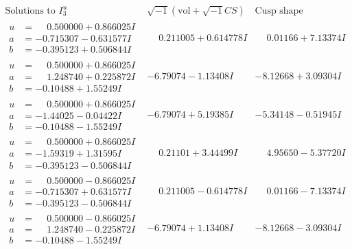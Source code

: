 \documentclass[1p]{elsarticle_modified}
\theoremstyle{definition}
\newcommand{\I}{\sqrt{-1}}
\begin{document}
$$\begin{array}{c|c|c}  
\text{Solutions to }I^u_{3}& \I (\text{vol} + \sqrt{-1}CS) & \text{Cusp shape}\\
 \hline 
\begin{aligned}
u &= \phantom{-}0.500000 + 0.866025 I \\
a &= -0.715307 - 0.631577 I \\
b &= -0.395123 + 0.506844 I\end{aligned}
 & \phantom{-}0.211005 + 0.614778 I & \phantom{-}0.01166 + 7.13374 I \\ \hline\begin{aligned}
u &= \phantom{-}0.500000 + 0.866025 I \\
a &= \phantom{-}1.248740 + 0.225872 I \\
b &= -0.10488 + 1.55249 I\end{aligned}
 & -6.79074 - 1.13408 I & -8.12668 + 3.09304 I \\ \hline\begin{aligned}
u &= \phantom{-}0.500000 + 0.866025 I \\
a &= -1.44025 - 0.04422 I \\
b &= -0.10488 - 1.55249 I\end{aligned}
 & -6.79074 + 5.19385 I & -5.34148 - 0.51945 I \\ \hline\begin{aligned}
u &= \phantom{-}0.500000 + 0.866025 I \\
a &= -1.59319 + 1.31595 I \\
b &= -0.395123 - 0.506844 I\end{aligned}
 & \phantom{-}0.21101 + 3.44499 I & \phantom{-}4.95650 - 5.37720 I \\ \hline\begin{aligned}
u &= \phantom{-}0.500000 - 0.866025 I \\
a &= -0.715307 + 0.631577 I \\
b &= -0.395123 - 0.506844 I\end{aligned}
 & \phantom{-}0.211005 - 0.614778 I & \phantom{-}0.01166 - 7.13374 I \\ \hline\begin{aligned}
u &= \phantom{-}0.500000 - 0.866025 I \\
a &= \phantom{-}1.248740 - 0.225872 I \\
b &= -0.10488 - 1.55249 I\end{aligned}
 & -6.79074 + 1.13408 I & -8.12668 - 3.09304 I \\ \hline\begin{aligned}

\end{aligned}
\end{array}$$
\end{document}
